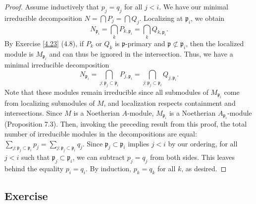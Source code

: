 \begin{proof}
Assume inductively that $p_j = q_j$ for all $j < i$. We have our minimal irreducible decomposition $N = \bigcap P_j = \bigcap Q_j$. Localizing at $\mathfrak{p}_i$, we obtain
$$N_{\mathfrak{p}_i} = \bigcap_k P_{k,\mathfrak{p}_i} = \bigcap_k Q_{k,\mathfrak{p}_i}.$$
By Exercise \ref{4.23} (4.8), if $P_k$ or $Q_k$ is $\mathfrak{p}$-primary and $\mathfrak{p} \not\subset \mathfrak{p}_i$, then the localized 
module is $M_{\mathfrak{p}_i}$ and can thus be ignored in the intersection. Thus, we have a minimal irreducible decomposition
$$N_{\mathfrak{p}_i} = \bigcap_{j: \mathfrak{p}_j \subset \mathfrak{p}_i} P_{j,\mathfrak{p}_i} = \bigcap_{j: \mathfrak{p}_j \subset \mathfrak{p}_i} Q_{j,\mathfrak{p}_i}.$$
Note that these modules remain irreducible since all submodules of $M_{\mathfrak{p}_i}$ come from localizing submodules of $M$, and localization respects containment and intersections.
Since $M$ is a Noetherian $A$-module, $M_{\mathfrak{p}_i}$ is a Noetherian $A_{\mathfrak{p}_i}$-module (Proposition 7.3). Then, invoking the preceding result from this proof,
the total number of irreducible modules in the decompositions are equal: $\sum_{j: \mathfrak{p}_j \subset \mathfrak{p}_i} p_j = \sum_{j: \mathfrak{p}_j \subset \mathfrak{p}_i} q_j$.
Since $\mathfrak{p}_j \subset \mathfrak{p}_i$ implies $j < i$ by our ordering, for all $j < i$ such that $\mathfrak{p}_j \subset \mathfrak{p}_i$, we can subtract $p_j = q_j$ from
both sides. This leaves behind the equality $p_i = q_i$. By induction, $p_k = q_k$ for all $k$, as desired.
\end{proof}

\subsection{Exercise}\label{7.20}

